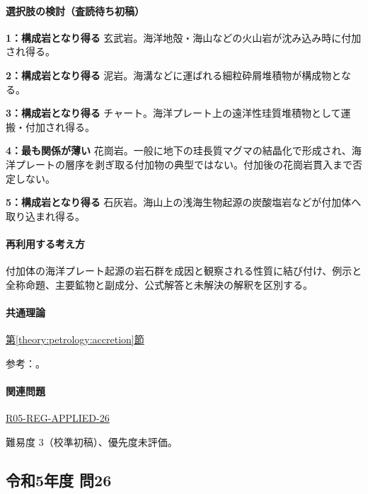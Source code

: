 \paragraph{選択肢の検討（査読待ち初稿）}\mbox{}\par

\noindent\textbf{1：構成岩となり得る} 玄武岩。海洋地殻・海山などの火山岩が沈み込み時に付加され得る。\par

\noindent\textbf{2：構成岩となり得る} 泥岩。海溝などに運ばれる細粒砕屑堆積物が構成物となる。\par

\noindent\textbf{3：構成岩となり得る} チャート。海洋プレート上の遠洋性珪質堆積物として運搬・付加され得る。\par

\noindent\textbf{4：最も関係が薄い} 花崗岩。一般に地下の珪長質マグマの結晶化で形成され、海洋プレートの層序を剥ぎ取る付加物の典型ではない。付加後の花崗岩貫入まで否定しない。\par

\noindent\textbf{5：構成岩となり得る} 石灰岩。海山上の浅海生物起源の炭酸塩岩などが付加体へ取り込まれ得る。\par

\paragraph{再利用する考え方} 付加体の海洋プレート起源の岩石群を成因と観察される性質に結び付け、例示と全称命題、主要鉱物と副成分、公式解答と未解決の解釈を区別する。

\paragraph{共通理論} \hyperref[theory:petrology:accretion]{第\ref*{theory:petrology:accretion}節}

\par 参考：\cite{aist_accretion2026,gsj_saganoseki1993}。

\paragraph{関連問題} \hyperref[q:r05-reg-applied-26]{R05-REG-APPLIED-26}

\par 難易度 3（校準初稿）、優先度未評価。

\subsection{令和5年度 問26}
\label{q:r05-reg-applied-26}

